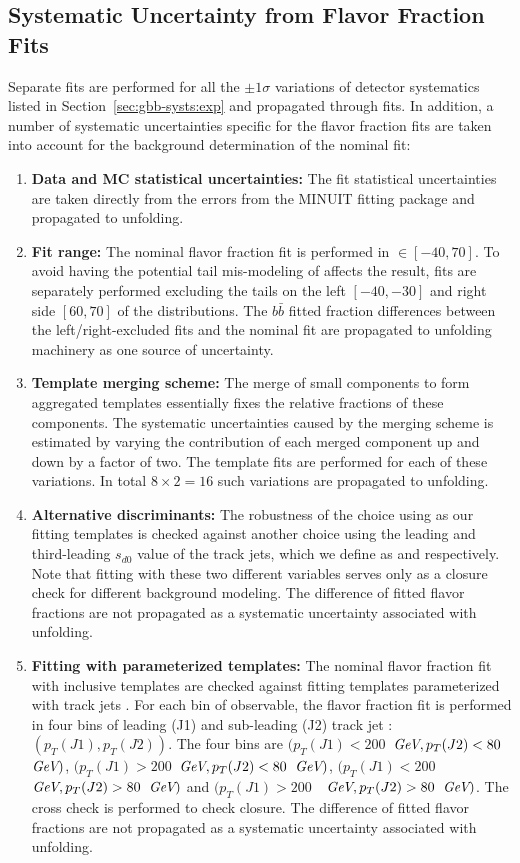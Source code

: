 \subsection{Systematic Uncertainty from Flavor Fraction Fits}
\label{sec:gbb-sub_systematics}

Separate fits are performed for all the $\pm 1\sigma$ variations of detector systematics listed in Section~\ref{sec:gbb-systs:exp} and propagated through fits. In addition, a number of systematic uncertainties specific for the flavor fraction fits are taken into account for the background determination of the nominal fit:

\begin{enumerate}
  \item \textbf{Data and MC statistical uncertainties:} The fit statistical uncertainties are taken directly from the errors from the MINUIT fitting package and propagated to unfolding.
  \item \textbf{Fit range:} The nominal flavor fraction fit is performed in \subsdzero$\in[-40, 70]$. To avoid having the potential tail mis-modeling of \subsdzero affects the result, fits are separately performed excluding the tails on the left $[-40, -30]$ and right side $[60, 70]$ of the \subsdzero distributions. The $b\bar b$ fitted fraction differences between the left/right-excluded fits and the nominal fit are propagated to unfolding machinery as one source of uncertainty. 
  \item \textbf{Template merging scheme:} The merge of small components to form aggregated templates essentially fixes the relative fractions of these components. The systematic uncertainties caused by the merging scheme is estimated by varying the contribution of each merged component up and down by a factor of two. The template fits are performed for each of these variations. In total $8\times 2 =16$ such variations are propagated to unfolding.
  \item \textbf{Alternative discriminants:} The robustness of the choice using \subsdzero as our fitting templates is checked against another choice using the leading and third-leading $s_{d0}$ value of the track jets, which we define as \sdzero and \subsubsdzero respectively. Note that fitting with these two different variables serves only as a closure check for different background modeling. The difference of fitted flavor fractions are not propagated as a systematic uncertainty associated with unfolding.
  \item \textbf{Fitting with \pt parameterized templates:} The nominal flavor fraction fit with inclusive \subsdzero templates are checked against fitting templates parameterized with track jets \pt. For each bin of observable, the flavor fraction fit is performed in four bins of leading (J1) and sub-leading (J2) track jet \pt: $(p_T(J1), p_T(J2))$. The four bins are $(p_T(J1)<200$~$\textit{GeV}, p_T(J2)<80$~$\textit{GeV})$, $(p_T(J1)>200$~$\textit{GeV}, p_T(J2)<80$~$\textit{GeV})$, $(p_T(J1)<200$~$\textit{GeV}, p_T(J2)>80$~$\textit{GeV})$ and $(p_T(J1)>200$~~$\textit{GeV}, p_T(J2)>80$~$\textit{GeV})$. The cross check is performed to check closure. The difference of fitted flavor fractions are not propagated as a systematic uncertainty associated with unfolding.

\end{enumerate}
